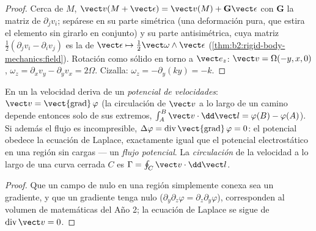 \begin{proof}
Cerca de $M$, $\vect v(M + \vect\epsilon) = \vect v(M) + \mathbf G\vect\epsilon$ con
$\mathbf G$ la matriz de $\partial_jv_i$; sepárese en su parte simétrica
(una deformación pura, que estira el elemento sin girarlo en conjunto) y
su parte antisimétrica, cuya matriz $\tfrac12(\partial_jv_i -
\partial_iv_j)$ es la de $\vect\epsilon \mapsto \tfrac12\vect\omega\wedge\vect\epsilon$
(\cref{thm:b2:rigid-body-mechanics:field}). Rotación como sólido en torno a $\vect e_z$:
$\vect v = \Omega(-y, x, 0)$, $\omega_z = \partial_xv_y - \partial_yv_x = 2\Omega$.
Cizalla: $\omega_z = -\partial_y(ky) = -k$.
\end{proof}

\begin{definition}\label{def:b2:fluid-kinematics:potential}
En un  la velocidad deriva de un \emph{potencial de
velocidades}: $\vect v = \operatorname{\vect{grad}}\varphi$ (la circulación
de $\vect v$ a lo largo de un camino depende entonces solo de sus extremos, $\int_A^B\vect v
\cdot\dd\vect l = \varphi(B) - \varphi(A)$). Si además el flujo es
incompresible, $\Delta\varphi = \operatorname{div}\operatorname{\vect{grad}}
\varphi = 0$: el potencial obedece la ecuación de Laplace, exactamente
igual que el potencial electrostático en una región sin cargas --- un
\emph{flujo potencial}. La \emph{circulación} de la velocidad a lo largo de
una curva cerrada $C$ es $\Gamma = \oint_C\vect v\cdot\dd\vect l$.
\end{definition}

\begin{proof}
Que un campo de  nulo en una región simplemente conexa sea un
gradiente, y que un gradiente tenga  nulo ($\partial_y\partial_z\varphi = \partial_z\partial_y\varphi$),
corresponden al volumen de matemáticas del Año 2; la ecuación de Laplace
se sigue de $\operatorname{div}\vect v = 0$.
\end{proof}

